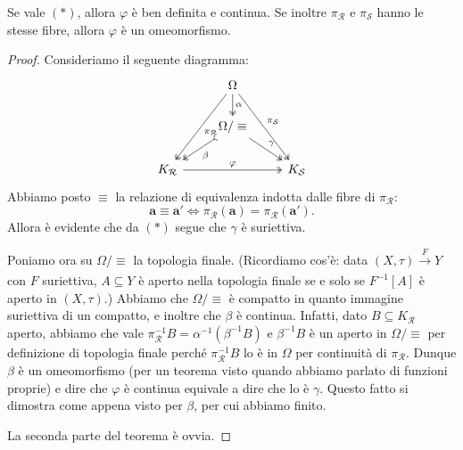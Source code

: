 \begin{lemma}
	Se vale $(*)$, allora $\varphi$ è ben definita e continua. Se inoltre $\pi_{\mathcal R}$ e $\pi_{\mathcal S}$ hanno le stesse fibre, allora $\varphi$ è un omeomorfismo.
\end{lemma}
\begin{proof}
	Consideriamo il seguente diagramma: 
	$$
	\begin{tikzcd}
                                              & \Omega \arrow[ldd, "\pi_\mathcal R", two heads] \arrow[rdd, "\pi_\mathcal S", two heads] \arrow[d, "\alpha", two heads] &              \\
                                              & \Omega/\equiv \arrow[ld, "\beta", two heads, tail] \arrow[rd, "\gamma", two heads]                &              \\
K_\mathcal R \arrow[rr, "\varphi", two heads] &                                                                                                   & K_\mathcal S
\end{tikzcd}
	$$
	Abbiamo posto $\equiv$ la relazione di equivalenza indotta dalle fibre di $\pi_{\mathcal R}$: 
	$$\mathbf a\equiv\mathbf a'\iff \pi_{\mathcal R}(\mathbf a) = \pi_{\mathcal R}(\mathbf a').$$
	Allora è evidente che da $(*)$ segue che $\gamma$ è suriettiva. 
	
	Poniamo ora su $\Omega/\equiv$ la topologia finale. (Ricordiamo cos'è: data $(X,\tau)\xrightarrow[]{F} Y$ con $F$ suriettiva, $A\subseteq Y$ è aperto nella topologia finale se e solo se $F^{-1}[A]$ è aperto in $(X,\tau)$.)
	Abbiamo che $\Omega/\equiv$ è compatto in quanto immagine suriettiva di un compatto, e inoltre che $\beta$ è continua.
	Infatti, dato $B\subseteq K_{\mathcal R}$ aperto, abbiamo che vale $\pi_{\mathcal R}^{-1}B = \alpha^{-1}(\beta^{-1}B)$ e $\beta^{-1}B$ è un aperto in $\Omega/\equiv$ per definizione di topologia finale perché $\pi_{\mathcal R}^{-1}B$ lo è in $\Omega$ per continuità di $\pi_{\mathcal R}$.
	Dunque $\beta$ è un omeomorfismo (per un teorema visto quando abbiamo parlato di funzioni proprie) e dire che $\varphi$ è continua equivale a dire che lo è $\gamma$. Questo fatto si dimostra come appena visto per $\beta$, per cui abbiamo finito.
	
	La seconda parte del teorema è ovvia.
\end{proof}

\begin{esempio}
\end{esempio}


